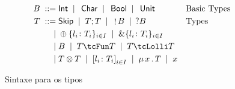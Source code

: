 
\begin{figure}[ht]
  \begin{align*}
    \tcBase \grmeq & \inte \grmor \, \chare \grmor \, \boole \grmor \, \unite && \text{Basic Types}\\
    T \grmeq       & \tskip \grmor \tSemi{T}{T} \grmor \,\tOut{\tcBase} \grmor \,\tIn{\tcBase} && \text{Types}\\
    \grmor         & \tIChoice\{l_i\colon T_i\}_{i\in I} \grmor \tEChoice\{l_i\colon T_i\}_{i\in I} \\ 
    \grmor         & \tcBase \grmor \tUnFun{T}{T} \grmor \tLinFun{T}{T}\\   
    \grmor         & \tPair{T}{T} \grmor \tDatatype{l_i\colon T_i}_{i\in I} \grmor \tRec{x}{T} \grmor x%
  \end{align*}
  \hrulefill
  \caption{Sintaxe para os tipos}
  \label{fig:types}
\end{figure}


